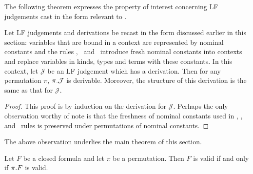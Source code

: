 The following theorem expresses the property of interest
concerning LF judgements cast in the form relevant to \logic. 
%
\begin{theorem}\label{th:perm-lf}
Let LF judgements and derivations be recast in the form discussed
earlier in this section: variables that are bound in a context are
represented by nominal constants and the rules \canonkindpi,
\canonfampi\ and \canontermlam\ introduce fresh nominal constants into
contexts and replace variables in kinds, types and terms with these
constants.
%
In this context, let $\mathcal{J}$ be an LF judgement which has a
derivation. 
%
Then for any permutation $\pi$, ${\pi}.{\mathcal{J}}$ is derivable.
%
Moreover, the structure of this derivation is the same as that for
$\mathcal{J}$.
\end{theorem} 
\begin{proof}
This proof is by induction on the derivation for $\mathcal{J}$.
%
Perhaps the only observation worthy of note is that the freshness of
nominal constants used in \canonkindpi, \canonfampi, and
\canontermlam\ rules is preserved under permutations of nominal
constants. 
\end{proof}
%
The above observation underlies the main theorem of this section.
%
\begin{theorem}\label{th:perm-form}
Let $F$ be a closed formula and let $\pi$ be a permutation.
%
Then $F$ is valid if and only if ${\pi}.{F}$ is valid.
\end{theorem}
